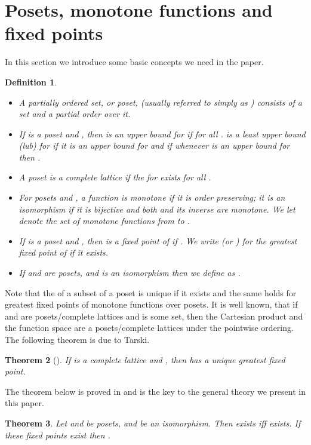 \documentclass[submission]{eptcs}
\newtheorem{theorem}{Theorem}[section]
\newtheorem{corollary}[theorem]{Corollary}
\newtheorem{definition}[theorem]{Definition}
\begin{document}
\section{Posets, monotone functions and fixed points}
In this section we introduce some basic concepts we need in the paper.
\begin{definition}\quad
\begin{itemize}
\item 
  A \emph{partially ordered set}, or \emph{poset}, 
  (usually referred to simply as ) consists of a set  and a
  partial order  over it. 
\item If  is a poset and , then  is an
  \emph{upper bound} for  if  for all .  is a
  \emph{least upper bound} (lub) for  if it is an upper bound for
   and if whenever  is an upper bound for  then .
\item A poset  is a \emph{complete lattice} if the 
  for  exists for all .
\item For posets  and , a function  is
  monotone if it is order preserving; it is an \emph{isomorphism} if it is
  bijective and both  and its inverse  are monotone.
  We let  denote the set of monotone functions from  to
  .
\item If  is a poset and , then  is a fixed
  point of  if .  We write  (or ) for
  the greatest fixed point  of  if it exists.
\item If  and  are posets,  and  is an isomorphism then we define  as
  .
\end{itemize}
\end{definition}
Note that the  of a subset of a poset  is unique if it exists
and the same holds for greatest fixed points of monotone functions over
posets. It is well known, that if  and  are posets/complete lattices
and  is some set, then the Cartesian product  and the
function space  are a posets/complete lattices under the
pointwise ordering. The following theorem is due to Tarski.
\begin{theorem}[\cite{Ta55}]\label{tarski}
  If  is a complete lattice and , then  has
  a unique greatest fixed point.
\end{theorem}
The theorem below is proved in \cite{AILS2011} and is the key to the
general theory we present in this paper.
\begin{theorem} \label{thm:isomorph}Let  and  be posets,  and  be an isomorphism. Then 
  exists iff  exists. If these fixed points exist then
  .  
\iffalse
\item If  then
  .

\item   is an isomorphism.
\item If  then 
  is well-defined for fixed  and  is in  for 
  and .
\item If   and  are posets,  and , then 
 and .\fi
\end{theorem}
\iffalse
\begin{corollary}
  If  and  then 
  .
\end{corollary}
\fi
\end{document}

